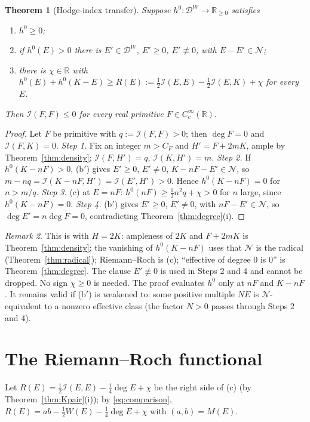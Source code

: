 \documentclass[11pt]{amsart}
\newtheorem{theorem}{Theorem}[section]
\theoremstyle{definition}
\theoremstyle{remark}
\newtheorem{remark}[theorem]{Remark}
\newcommand{\R}{\mathbb R}
\newcommand{\DW}{\mathcal D^{W}}
\newcommand{\Nr}{\mathcal N}
\newcommand{\I}{\mathcal I}
\newcommand{\dg}{\deg}
\begin{document}
\begin{theorem}[Hodge-index transfer]\label{thm:transfer}
Suppose $h^0:\DW\to\R_{\ge0}$ satisfies
\begin{enumerate}
\item[(a)] $h^0\ge0$;
\item[(b$'$)] if $h^0(E)>0$ there is $E'\in\DW$, $E'\ge0$, $E'\not\equiv0$, with $E-E'\in\Nr$;
\item[(c)] there is $\chi\in\R$ with $h^0(E)+h^0(K-E)\ge R(E):=\frac12\I(E,E)-\frac12\I(E,K)+\chi$ for every $E$.
\end{enumerate}
Then $\I(F,F)\le0$ for every real primitive $F\in C_c^\infty(\R)$.
\end{theorem}
\begin{proof}
Let $F$ be primitive with $q:=\I(F,F)>0$; then $\dg F=0$ and $\I(F,K)=0$.
\emph{Step 1.} Fix an integer $m>C_F$ and $H'=F+2mK$, ample by Theorem~\ref{thm:density}; $\I(F,H')=q$, $\I(K,H')=m$.
\emph{Step 2.} If $h^0(K-nF)>0$, (b$'$) gives $E'\ge0$, $E'\ne0$, $K-nF-E'\in\Nr$, so
$m-nq=\I(K-nF,H')=\I(E',H')>0$. Hence $h^0(K-nF)=0$ for $n>m/q$.
\emph{Step 3.} (c) at $E=nF$: $h^0(nF)\ge\frac12n^2q+\chi>0$ for $n$ large, since $h^0(K-nF)=0$.
\emph{Step 4.} (b$'$) gives $E'\ge0$, $E'\ne0$, with $nF-E'\in\Nr$, so $\dg E'=n\dg F=0$, contradicting Theorem~\ref{thm:degree}(i).
\end{proof}

\begin{remark}\label{rem:hartshorne}
This is \cite[V.1.9]{Hartshorne} with $H=2K$: ampleness of $2K$ and $F+2mK$ is Theorem~\ref{thm:density};
the vanishing of $h^0(K-nF)$ uses that $\Nr$ is the radical (Theorem~\ref{thm:radical}); Riemann--Roch is (c);
``effective of degree $0$ is $0$'' is Theorem~\ref{thm:degree}. The clause $E'\not\equiv0$ is used in Steps 2
and 4 and cannot be dropped. No sign $\chi\ge0$ is needed. The proof evaluates $h^0$ only at $nF$ and
$K-nF$. It remains valid if (b$'$) is weakened to: some positive multiple $NE$ is $\Nr$-equivalent to a
nonzero effective class (the factor $N>0$ passes through Steps 2 and 4).
\end{remark}

\section{The Riemann--Roch functional}\label{sec:RR}

Let $R(E)=\frac12\I(E,E)-\frac14\dg E+\chi$ be the right side of (c) (by Theorem~\ref{thm:Kpair}(i)); by
\eqref{eq:comparison}, $R(E)=ab-\frac12W(E)-\frac14\dg E+\chi$ with $(a,b)=M(E)$.
\end{document}
